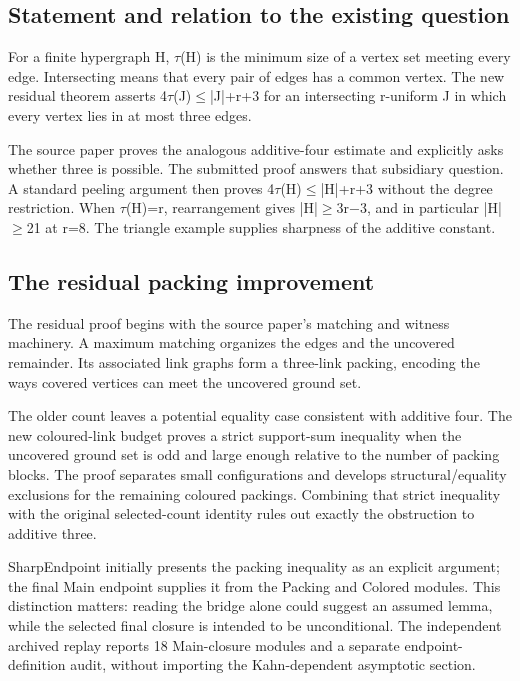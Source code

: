 \documentclass[11pt,a4paper]{article}
\begin{document}
\subsection{Statement and relation to the existing question}
For a finite hypergraph H, \ensuremath{\tau}(H) is the minimum size of a vertex set meeting every edge. Intersecting means that every pair of edges has a common vertex. The new residual theorem asserts 4\ensuremath{\tau}(J)\ensuremath{\leq}|J|+r+3 for an intersecting r-uniform J in which every vertex lies in at most three edges.

The source paper proves the analogous additive-four estimate and explicitly asks whether three is possible. The submitted proof answers that subsidiary question. A standard peeling argument then proves 4\ensuremath{\tau}(H)\ensuremath{\leq}|H|+r+3 without the degree restriction. When \ensuremath{\tau}(H)=r, rearrangement gives |H|\ensuremath{\geq}3r\ensuremath{-}3, and in particular |H|\ensuremath{\geq}21 at r=8. The triangle example supplies sharpness of the additive constant.

\subsection{The residual packing improvement}
The residual proof begins with the source paper's matching and witness machinery. A maximum matching organizes the edges and the uncovered remainder. Its associated link graphs form a three-link packing, encoding the ways covered vertices can meet the uncovered ground set.

The older count leaves a potential equality case consistent with additive four. The new coloured-link budget proves a strict support-sum inequality when the uncovered ground set is odd and large enough relative to the number of packing blocks. The proof separates small configurations and develops structural/equality exclusions for the remaining coloured packings. Combining that strict inequality with the original selected-count identity rules out exactly the obstruction to additive three.

SharpEndpoint initially presents the packing inequality as an explicit argument; the final Main endpoint supplies it from the Packing and Colored modules. This distinction matters: reading the bridge alone could suggest an assumed lemma, while the selected final closure is intended to be unconditional. The independent archived replay reports 18 Main-closure modules and a separate endpoint-definition audit, without importing the Kahn-dependent asymptotic section.
\end{document}
